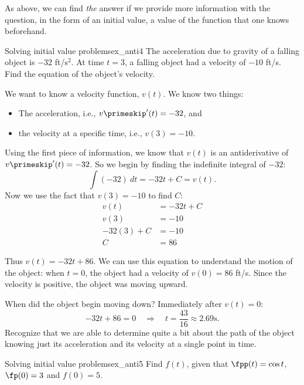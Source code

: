 As above, we can find \textit{the} answer if we provide more information with the question, in the form of an  initial value, a value of the function that one knows beforehand.\\

\begin{example}{Solving initial value problems}{ex_anti4}
The acceleration due to gravity of a falling object is $-32$ ft/s$^2$. At time $t=3$, a falling object had a velocity of $-10$ ft/s. Find the equation of the object's velocity.
\end{example}

\begin{solution}
{We want to know a velocity function, $v(t)$. We know two things:
	\begin{itemize}
		\item		The acceleration, i.e., $v\primeskip'(t)= -32$, and
		\item		the velocity at a specific time, i.e., $v(3) = -10$.
	\end{itemize}
Using the first piece of information, we know that $v(t)$ is an antiderivative of $v\primeskip'(t)=-32$. So we begin by finding the indefinite integral of $-32$:
		$$\int (-32)\ dt = -32t+C=v(t).$$
Now we use the fact that $v(3)=-10$ to find $C$:
\begin{align*}
	v(t) &= -32t+C \\
	v(3) &= -10 \\
	-32(3)+C &= -10\\
	C &= 86
\end{align*}

Thus $v(t)= -32t+86$. We can use this equation to understand the motion of the object: when $t=0$, the object had a velocity of $v(0) = 86$ ft/s. Since the velocity is positive, the object was moving upward.

When did the object begin moving down? Immediately after $v(t) = 0$:
$$-32t+86 = 0 \quad \Rightarrow\quad  t = \frac{43}{16}  \approx 2.69\text{s}.$$
Recognize that we are able to determine quite a bit about the path of the object knowing just its acceleration and its velocity at a single point in time.
}
\end{solution}

\begin{example}{Solving initial value problems}{ex_anti5}
 {
Find $f(t)$, given that $\fpp(t) = \cos t$, $\fp(0) = 3$ and $f(0) = 5$.}
\end{example}

